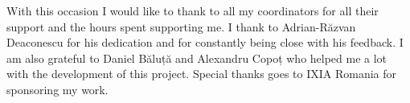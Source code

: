 \vspace*{7cm}
\begin{center}
With this occasion I would like to thank to all my coordinators for all their support and the hours spent supporting me.
I thank to Adrian-Răzvan Deaconescu for his dedication and for constantly being close with his feedback.
I am also grateful to Daniel Băluță and Alexandru Copoț who helped me a lot with the development of this project.
Special thanks goes to IXIA Romania for sponsoring my work.
\end{center}
